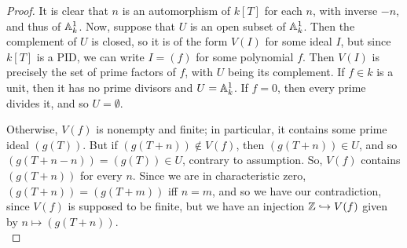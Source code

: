 \begin{proof}
	It is clear that $n$ is an automorphism of $k[T]$ for each $n$, with inverse $-n$, and thus of $\AA^1_k$. Now, suppose that $U$ is an open subset of $\AA^1_k$. Then the complement of $U$ is closed, so it is of the form $V(I)$ for some ideal $I$, but since $k[T]$ is a PID, we can write $I = (f)$ for some polynomial $f$. Then $V(I)$ is precisely the set of prime factors of $f$, with $U$ being its complement. If $f \in k$ is a unit, then it has no prime divisors and $U = \AA^1_k$. If $f = 0$, then every prime divides it, and so $U = \emptyset$.
	
	Otherwise, $V(f)$ is nonempty and finite; in particular, it contains some prime ideal $(g(T))$. But if $(g(T+n)) \notin V(f)$, then $(g(T+n)) \in U$, and so $(g(T+n-n)) = (g(T)) \in U$, contrary to assumption. So, $V(f)$ contains $(g(T+n))$ for every $n$. Since we are in characteristic zero, $(g(T+n)) = (g(T+m))$ iff $n = m$, and so we have our contradiction, since $V(f)$ is supposed to be finite, but we have an injection $\ZZ \hookrightarrow V(f)$ given by $n \mapsto (g(T+n))$. \\
	
	
\end{proof}

